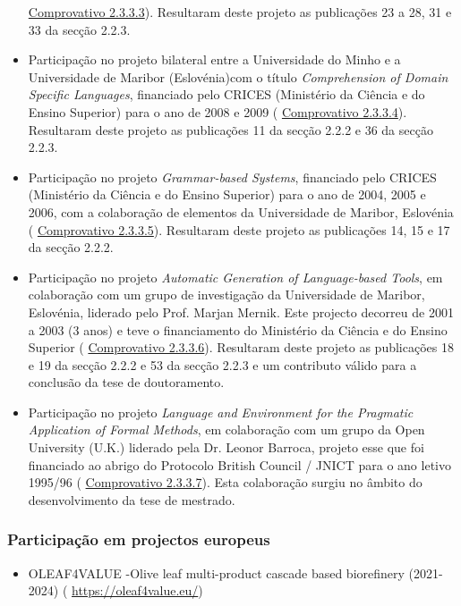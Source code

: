 \documentclass[11pt]{article}
\begin{document}
\begin{itemize}
{\href{run:Projectos/Quixote.pdf}{Comprovativo 2.3.3.3}). Resultaram deste projeto as publicações 23 a 28, 31 e 33 da secção 2.2.3.}
\item{Participação no projeto bilateral entre a Universidade do Minho e a Universidade de Maribor (Eslovénia)com o título {
\em{ Comprehension of Domain Specific Languages}}, financiado pelo CRICES (Ministério da Ciência e do Ensino Superior) para o ano de 2008 e 2009 (
\href{run:Projectos/declaracoesUM.pdf}{Comprovativo 2.3.3.4}). Resultaram deste projeto as publicações 11 da secção 2.2.2 e 36 da secção 2.2.3.}
\item{Participação no projeto {
\em{ Grammar-based Systems}}, financiado pelo CRICES (Ministério da Ciência e do Ensino Superior) para o ano de 2004, 2005 e 2006, com a colaboração de elementos da Universidade de Maribor, Eslovénia (
\href{run:Projectos/GBS.pdf}{Comprovativo 2.3.3.5}). Resultaram deste projeto as publicações 14, 15 e 17 da secção 2.2.2.}
\item{Participação no projeto {
\em{ Automatic Generation of Language-based Tools}}, em colaboração com um grupo de investigação da Universidade de Maribor, Eslovénia, liderado pelo Prof. Marjan Mernik. Este projecto decorreu de 2001 a 2003 (3 anos) e teve o financiamento do Ministério da Ciência e do Ensino Superior (
\href{run:Projectos/declaracoesUM.pdf}{Comprovativo 2.3.3.6}). Resultaram deste projeto as publicações 18 e 19 da secção 2.2.2 e 53 da secção 2.2.3 e um contributo válido para a conclusão da tese de doutoramento.}
\item{Participação no projeto {
\em{ Language and Environment for the Pragmatic Application of Formal Methods}}, em colaboração com um grupo da Open University (U.K.) liderado pela Dr. Leonor Barroca, projeto esse que foi financiado ao abrigo do Protocolo British Council / JNICT para o ano letivo 1995/96 (
\href{run:Projectos/declaracoesUM.pdf}{Comprovativo 2.3.3.7}). Esta colaboração surgiu no âmbito do desenvolvimento da tese de mestrado.}
\end{itemize}
\subsubsection{Participação em projectos europeus}
\begin{itemize}
\item{OLEAF4VALUE -Olive leaf multi-product cascade based biorefinery (2021-2024) (
\url{https://oleaf4value.eu/})}
\end{itemize}
\end{document}
